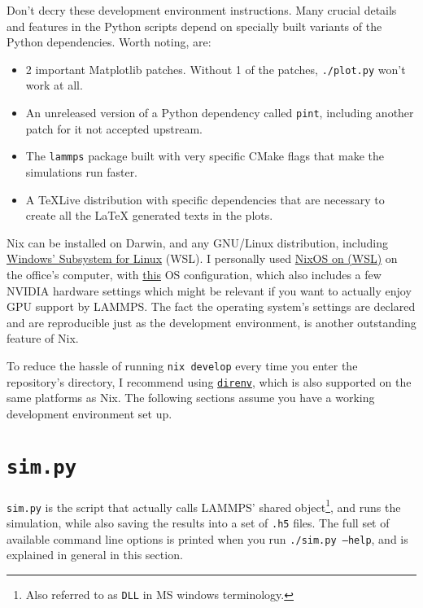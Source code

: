 Don't decry these development environment instructions. Many crucial details and features in the Python scripts depend on specially built variants of the Python dependencies. Worth noting, are:

\begin{itemize}
	\item 2 important Matplotlib patches. Without 1 of the patches, \texttt{./plot.py} won't work at all.
	\item An unreleased version of a Python dependency called \texttt{pint}, including another patch for it not accepted upstream.
	\item The \texttt{lammps} package built with very specific CMake flags that make the simulations run faster.
	\item A TeXLive distribution with specific dependencies that are necessary to create all the LaTeX generated texts in the plots.
\end{itemize}

Nix can be installed on Darwin, and any GNU/Linux distribution, including \href{https://learn.microsoft.com/en-us/windows/wsl/install}{Windows' Subsystem for Linux} (WSL). I personally used \href{https://github.com/nix-community/NixOS-WSL}{NixOS on (WSL)} on the office's computer, with \href{https://gitlab.com/doronbehar/nixos-configs/-/blob/b540a8fef332ff64d0ae52a67ef96758b7d2b396/flake.nix#L104-134}{this} OS configuration, which also includes a few NVIDIA hardware settings which might be relevant if you want to actually enjoy GPU support by LAMMPS. The fact the operating system's settings are declared and are reproducible just as the development environment, is another outstanding feature of Nix.

To reduce the hassle of running \texttt{nix develop} every time you enter the repository's directory, I recommend using \href{https://direnv.net/}{\texttt{direnv}}, which is also supported on the same platforms as Nix. The following sections assume you have a working development environment set up.

\section{\texttt{sim.py}}

\texttt{sim.py} is the script that actually calls LAMMPS' shared object\footnote{Also referred to as \texttt{DLL} in MS windows terminology.}, and runs the simulation, while also saving the results into a set of \texttt{.h5} files. The full set of available command line options is printed when you run \texttt{./sim.py --help}, and is explained in general in this section.

